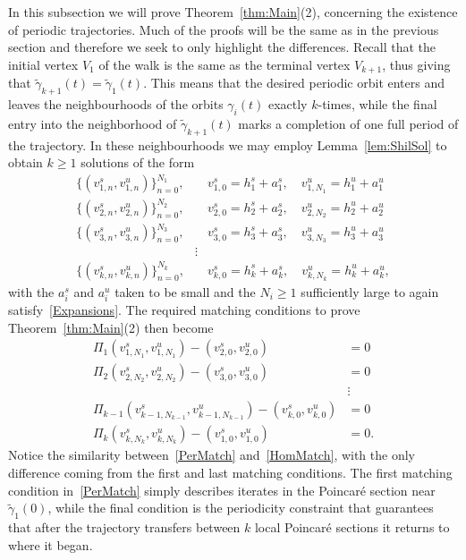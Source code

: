 \documentclass[11pt]{article}
\numberwithin{equation}{section}
\theoremstyle{plain}
\begin{document}
In this subsection we will prove Theorem~\ref{thm:Main}(2), concerning the existence of periodic trajectories. Much of the proofs will be the same as in the previous section and therefore we seek to only highlight the differences. Recall that the initial vertex $V_1$ of the walk is the same as the terminal vertex $V_{k+1}$, thus giving that $\tilde\gamma_{k+1}(t) = \tilde\gamma_1(t)$. This means that the desired periodic orbit enters and leaves the neighbourhoods of the orbits $\gamma_i(t)$ exactly $k$-times, while the final entry into the neighborhood of $\tilde\gamma_{k+1}(t)$ marks a completion of one full period of the trajectory. In these neighbourhoods we may employ Lemma~\ref{lem:ShilSol} to obtain $k \geq 1$ solutions of the form
\begin{equation}
	\begin{split}
		\{(v^s_{1,n},v^u_{1,n})\}_{n = 0}^{N_1},& \quad v^s_{1,0} = h^s_1 +a^s_1, \quad v^u_{1,N_1}= h^u_1 +a^u_1 \\
		\{(v^s_{2,n},v^u_{2,n})\}_{n = 0}^{N_2},& \quad v^s_{2,0} = h^s_2 +a^s_2, \quad v^u_{2,N_2}= h^u_2 +a^u_2 \\
		\{(v^s_{3,n},v^u_{3,n})\}_{n = 0}^{N_3},& \quad v^s_{3,0} = h^s_3 +a^s_3, \quad v^u_{3,N_3}= h^u_3 +a^u_3 \\
		&\vdots \\
		\{(v^s_{k,n},v^u_{k,n})\}_{n = 0}^{N_{k}},& \quad v^s_{k,0} = h^s_k +a^s_{k}, \quad v^u_{k,N_{k}}= h^u_k +a^u_{k},
	\end{split}	
\end{equation}  
with the $a^s_i$ and $a^u_i$ taken to be small and the $N_i \geq 1$ sufficiently large to again satisfy~\eqref{Expansions}. The required matching conditions to prove Theorem~\ref{thm:Main}(2) then become
\begin{equation}\label{PerMatch}
	\begin{split}
		\Pi_1(v^s_{1,N_1},v^u_{1,N_1}) - (v^s_{2,0},v^u_{2,0}) &= 0 \\
		\Pi_2(v^s_{2,N_2},v^u_{2,N_2}) - (v^s_{3,0},v^u_{3,0}) &= 0 \\
		&\vdots \\
		\Pi_{k-1}(v^s_{k-1,N_{k-1}},v^u_{k-1,N_{k-1}}) - (v^s_{k,0},v^u_{k,0}) &= 0 \\
		\Pi_k(v^s_{k,N_k},v^u_{k,N_k}) - (v^s_{1,0},v^u_{1,0}) &= 0 .
	\end{split}
\end{equation} 
Notice the similarity between~\eqref{PerMatch} and~\eqref{HomMatch}, with the only difference coming from the first and last matching conditions. The first matching condition in~\eqref{PerMatch} simply describes iterates in the Poincar\'e section near $\tilde\gamma_1(0)$, while the final condition is the periodicity constraint that guarantees that after the trajectory transfers between $k$ local Poincar\'e sections it returns to where it began. 
\end{document}
